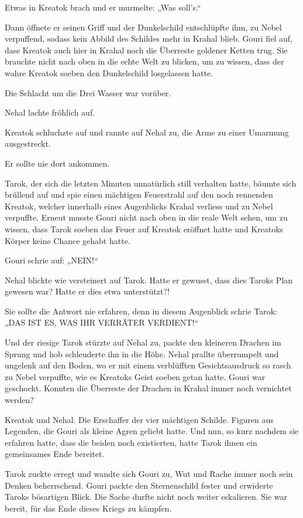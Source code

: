 Etwas in Kreatok brach und er murmelte: „Was soll’s.“

Dann öffnete er seinen Griff und der Dunkelschild entschlüpfte ihm, zu Nebel verpuffend, sodass kein Abbild des Schildes mehr in Krahal blieb. Gouri fiel auf, dass Kreatok auch hier in Krahal noch die Überreste goldener Ketten trug. Sie brauchte nicht nach oben in die echte Welt zu blicken, um zu wissen, dass der wahre Kreatok soeben den Dunkelschild losgelassen hatte.

Die Schlacht um die Drei Wasser war vorüber.

Nehal lachte fröhlich auf.

Kreatok schluchzte auf und rannte auf Nehal zu, die Arme zu einer Umarmung ausgestreckt.

Er sollte nie dort ankommen.

Tarok, der sich die letzten Minuten unnatürlich still verhalten hatte, bäumte sich brüllend auf und spie einen mächtigen Feuerstrahl auf den noch rennenden Kreatok, welcher innerhalb eines Augenblicks Krahal verliess und zu Nebel verpuffte. Erneut musste Gouri nicht nach oben in die reale Welt sehen, um zu wissen, dass Tarok soeben das Feuer auf Kreatok eröffnet hatte und Kreatoks Körper keine Chance gehabt hatte.

Gouri schrie auf: „NEIN!“

Nehal blickte wie versteinert auf Tarok. Hatte er gewusst, dass dies Taroks Plan gewesen war? Hatte er dies etwa unterstützt?!

Sie sollte die Antwort nie erfahren, denn in diesem Augenblick schrie Tarok: „DAS IST ES, WAS IHR VERRÄTER VERDIENT!“

Und der riesige Tarok stürzte auf Nehal zu, packte den kleineren Drachen im Sprung und hob schleuderte ihn in die Höhe. Nehal prallte überrumpelt und ungelenk auf den Boden, wo er mit einem verblüfften Gesichtsausdruck so rasch zu Nebel verpuffte, wie es Kreatoks Geist soeben getan hatte. Gouri war geschockt. Konnten die Überreste der Drachen in Krahal immer noch vernichtet werden?

Kreatok und Nehal. Die Erschaffer der vier mächtigen Schilde. Figuren aus Legenden, die Gouri als kleine Agren geliebt hatte. Und nun, so kurz nachdem sie erfahren hatte, dass die beiden noch existierten, hatte Tarok ihnen ein gemeinsames Ende bereitet.

Tarok zuckte erregt und wandte sich Gouri zu, Wut und Rache immer noch sein Denken beherrschend. Gouri packte den Sternenschild fester und erwiderte Taroks bösartigen Blick. Die Sache durfte nicht noch weiter eskalieren. Sie war bereit, für das Ende dieses Kriegs zu kämpfen.



